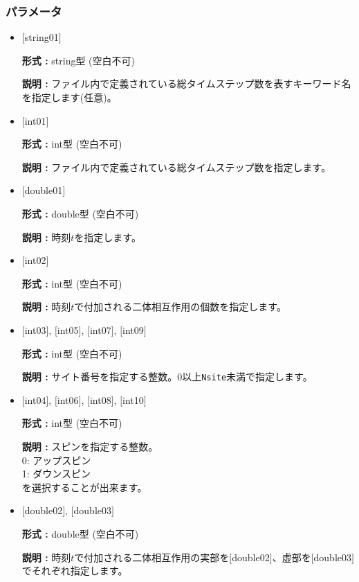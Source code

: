 \subsubsection{パラメータ}
 \begin{itemize}

   \item  $[$string01$]$
   
    {\bf 形式 :} string型 (空白不可)

   {\bf 説明 :} ファイル内で定義されている総タイムステップ数を表すキーワード名を指定します(任意)。

   \item  $[$int01$]$
   
    {\bf 形式 :} int型 (空白不可)

   {\bf 説明 :} ファイル内で定義されている総タイムステップ数を指定します。

\item  $[$double01$]$

 {\bf 形式 :} double型 (空白不可)

{\bf 説明 :}  時刻$t$を指定します。

 \item  $[$int02$]$

 {\bf 形式 :} int型 (空白不可)

{\bf 説明 :} 時刻$t$で付加される二体相互作用の個数を指定します。
 

  \item  $[$int03$]$, $[$int05$]$, $[$int07$]$, $[$int09$]$

 {\bf 形式 :} int型 (空白不可)

{\bf 説明 :} サイト番号を指定する整数。0以上\verb|Nsite|{未満}で指定します。
 
  \item  $[$int04$]$, $[$int06$]$, $[$int08$]$, $[$int10$]$

 {\bf 形式 :} int型 (空白不可)

{\bf 説明 :} スピンを指定する整数。\\
0: アップスピン\\
1: ダウンスピン\\
を選択することが出来ます。

\item  $[$double02$]$, $[$double03$]$

 {\bf 形式 :} double型 (空白不可)

{\bf 説明 :} 時刻$t$で付加される二体相互作用の実部を$[$double02$]$、虚部を$[$double03$]$でそれぞれ指定します。

\end{itemize}

